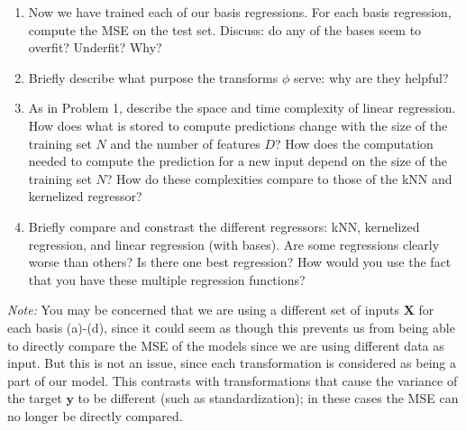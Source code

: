 \documentclass[submit]{../harvardml}
\begin{document}
\begin{problem}
\begin{enumerate}
        Then, create a plot of the fitted regression line for each basis against a scatter plot of the training data. Boilerplate plotting code is provided in the notebook---you will only need to finish up a part of it. \textbf{All you need to include in your writeup for this part are these four plots.}

        \item Now we have trained each of our basis regressions. For each basis regression, compute the MSE on the test set. Discuss: do any of the bases seem to overfit? Underfit? Why?

        \item Briefly describe what purpose the transforms $\phi$ serve: why are they helpful?

        \item As in Problem 1, describe the space and time complexity of linear regression.  How does what is stored to compute predictions change with the size of the training set $N$ and the number of features $D$?  How does the computation needed to compute the prediction for a new input depend on the size of the training set $N$?  How do these complexities compare to those of the kNN and kernelized regressor?

        \item Briefly compare and constrast the different regressors: kNN, kernelized regression, and linear regression (with bases). Are some regressions clearly worse than others?  Is there one best regression?  How would you use the fact that you have these multiple regression functions?
    \end{enumerate}

    \noindent \textit{Note:} You may be concerned that we are using a different set of inputs $\mathbf{X}$ for each basis (a)-(d), since it could seem as though this prevents us from being able to directly compare the MSE of the models since we are using different data as input. But this is not an issue, since each transformation is considered as being a part of our model. This contrasts with transformations that cause the variance of the target $\mathbf{y}$ to be different  (such as standardization); in these cases the MSE can no longer be directly compared.
\end{problem}

\newpage
\end{document}
